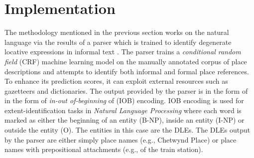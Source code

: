 \documentclass[letter]{sig-alternate}
\begin{document}


\section{Implementation}
The methodology mentioned in the previous section works on the natural language via the results of a parser which is trained to identify degenerate locative expressions in informal text \cite{fei:locative}. The parser trains a \textit{conditional random field} (CRF) machine learning model on the manually annotated corpus of place descriptions \cite{tuw} and attempts to identify both informal and formal place references. To enhance its prediction scores, it can exploit external resources such as gazetteers and dictionaries. The output provided by the parser is in the form of in the form of \textit{in-out of-beginning} of (IOB) encoding. IOB encoding is used for extent-identification tasks in \textit{Natural Language Processing} where each word is marked as either the beginning of an entity (B-NP), inside an entity (I-NP) or outside the entity (O). The entities in this case are the DLEs. 
The DLEs output by the parser are either simply place names (e.g., Chetwynd Place) or place names with prepositional attachments (e.g., of the train station).
\end{document}
